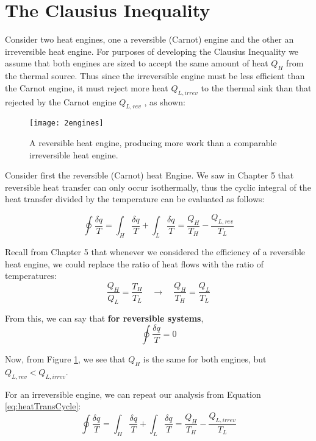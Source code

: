 \section{The Clausius Inequality}

Consider two heat engines, one a reversible (Carnot) engine and the other an irreversible heat engine. For purposes of developing the Clausius Inequality we assume that both engines are sized to accept the same amount of heat $Q_H$ from the thermal source. Thus since the irreversible engine must be less efficient than the Carnot engine, it must reject more heat $Q_{L,irrev}$ to the thermal sink than that rejected by the Carnot engine $Q_{L,rev}$ , as shown:
\begin{figure}[H]
  \centering
  \texttt{[image: 2engines]}
  \caption{A reversible heat engine, producing more work than a comparable irreversible heat engine.}
  \label{fig:2engines}
\end{figure}

Consider first the reversible (Carnot) heat Engine. We saw in Chapter 5 that reversible heat transfer can only occur isothermally, thus the cyclic integral of the heat transfer divided by the temperature can be evaluated as follows:

\begin{equation}\label{eq:heatTransCycle}
  \oint \frac{\delta q}{T} = \int_H \frac{\delta q}{T} + \int_L \frac{\delta q}{T} = \frac{Q_H}{T_H} - \frac{Q_{L,rev}}{T_L}
\end{equation}

Recall from Chapter 5 that whenever we considered the efficiency of a reversible heat engine, we could replace the ratio of heat flows with the ratio of temperatures:
\begin{equation*}
  \frac{Q_H}{Q_L} = \frac{T_H}{T_L} \quad\rightarrow\quad \frac{Q_H}{T_H} = \frac{Q_{L}}{T_L}
\end{equation*}

From this, we can say that {\bf for reversible systems},
\begin{equation*}
  \oint \frac{\delta q}{T} = 0
\end{equation*}

Now, from Figure \ref{fig:2engines}, we see that $Q_H$ is the same for both engines, but $Q_{L,rev} < Q_{L, irrev}$.

For an irreversible engine, we can repeat our analysis from Equation \ref{eq:heatTransCycle}:
\begin{equation*}
  \oint \frac{\delta q}{T} = \int_H \frac{\delta q}{T} + \int_L \frac{\delta q}{T} = \frac{Q_H}{T_H} - \frac{Q_{L,irrev}}{T_L}
\end{equation*}

